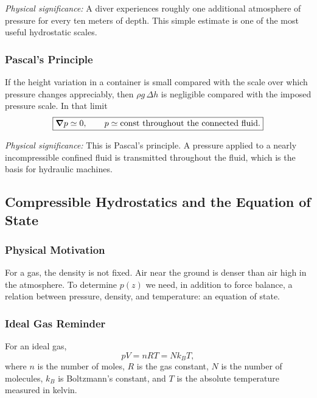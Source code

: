 \documentclass[../main.tex]{subfiles}
\begin{document}
\textit{Physical significance:} A diver experiences roughly one additional atmosphere of pressure for every ten meters of depth. This simple estimate is one of the most useful hydrostatic scales.

\subsubsection*{Pascal's Principle}
If the height variation in a container is small compared with the scale over which pressure changes appreciably, then $\rho g\,\Delta h$ is negligible compared with the imposed pressure scale. In that limit
\begin{equation}
  \boxed{\grad p\simeq 0,\qquad p\simeq \mathrm{const}\ \text{throughout the connected fluid}.}
  \label{eq:lec10_pascal_principle}
\end{equation}

\textit{Physical significance:} This is Pascal's principle. A pressure applied to a nearly incompressible confined fluid is transmitted throughout the fluid, which is the basis for hydraulic machines.

\subsection{Compressible Hydrostatics and the Equation of State}\label{sec:lec10:compressible-hydrostatics}

\subsubsection*{Physical Motivation}
For a gas, the density is not fixed. Air near the ground is denser than air high in the atmosphere. To determine $p(z)$ we need, in addition to force balance, a relation between pressure, density, and temperature: an equation of state.

\subsubsection*{Ideal Gas Reminder}
For an ideal gas,
\begin{equation}
  \boxed{pV=nRT=Nk_B T,}
  \label{eq:lec10_ideal_gas_law}
\end{equation}
where $n$ is the number of moles, $R$ is the gas constant, $N$ is the number of molecules, $k_B$ is Boltzmann's constant, and $T$ is the absolute temperature measured in kelvin.
\end{document}

